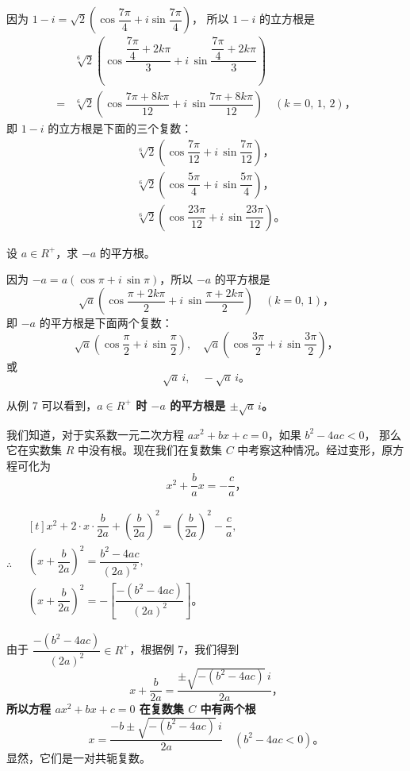 \jie 因为 $1 - i = \sqrt{2} \left( \cos\dfrac{7\pi}{4} + i \sin\dfrac{7\pi}{4} \right)$，
所以 $1 - i$ 的立方根是
\begin{align*}
    & \sqrt[6]{2} \left( \cos\dfrac{\dfrac{7\pi}{4} + 2k\pi}{3} + i\,\sin\dfrac{\dfrac{7\pi}{4} + 2k\pi}{3} \right) \\
    ={} & \sqrt[6]{2} \left( \cos\dfrac{7\pi + 8k\pi}{12} + i\,\sin\dfrac{7\pi + 8k\pi}{12} \right) \quad (k = 0,\, 1, \, 2) \text{，}
\end{align*}
即 $1 - i$ 的立方根是下面的三个复数：
\begin{align*}
    & \sqrt[6]{2} \left( \cos\dfrac{7\pi}{12} + i\,\sin\dfrac{7\pi}{12} \right) \text{，} \\
    & \sqrt[6]{2} \left( \cos\dfrac{5\pi}{4} + i\,\sin\dfrac{5\pi}{4} \right) \text{，} \\
    & \sqrt[6]{2} \left( \cos\dfrac{23\pi}{12} + i\,\sin\dfrac{23\pi}{12} \right) \text{。}
\end{align*}


\liti 设 $a \in R^+$，求 $-a$ 的平方根。

\jie 因为 $-a = a(\cos\pi + i\,\sin\pi)$，所以 $-a$ 的平方根是
$$ \sqrt{a} \left( \cos\dfrac{\pi + 2k\pi}{2} + i\,\sin\dfrac{\pi + 2k\pi}{2} \right) \quad (k = 0,\, 1) \text{，}$$
即 $-a$ 的平方根是下面两个复数：
$$
    \sqrt{a} \left( \cos\dfrac{\pi}{2} + i\,\sin\dfrac{\pi}{2} \right),\quad
    \sqrt{a} \left( \cos\dfrac{3\pi}{2} + i\,\sin\dfrac{3\pi}{2} \right) \text{，}
$$
或
$$ \sqrt{a}\,i, \quad -\sqrt{a}\,i \text{。} $$

从例 7 可以看到，\textbf{$a \in R^+$ 时 $-a$ 的平方根是 $\pm\sqrt{a}\,i$。}

我们知道，对于实系数一元二次方程 $ax^2 + bx + c = 0$，如果 $b^2 - 4ac < 0$，
那么它在实数集 $R$ 中没有根。现在我们在复数集 $C$ 中考察这种情况。经过变形，原方程可化为
$$ x^2 + \dfrac{b}{a} x = - \dfrac{c}{a} \text{，} $$

$\therefore \quad \begin{gathered}[t]
    x^2 + 2 \cdot x \cdot \dfrac{b}{2a} + \left( \dfrac{b}{2a} \right)^2 = \left( \dfrac{b}{2a} \right)^2 - \dfrac{c}{a}, \\
    \left( x + \dfrac{b}{2a} \right)^2 = \dfrac{b^2 - 4ac}{(2a)^2} , \\
    \left( x + \dfrac{b}{2a} \right)^2 = - \left[ \dfrac{-(b^2 - 4ac)}{(2a)^2} \right] \text{。}
\end{gathered}$

由于 $\dfrac{-(b^2 - 4ac)}{(2a)^2} \in R^+$，根据例 7，我们得到
$$ x + \dfrac{b}{2a} = \dfrac{\pm \sqrt{-(b^2 - 4ac)}\,i}{2a} \text{，} $$
\textbf{所以方程 $ax^2 + bx + c = 0$ 在复数集 $C$ 中有两个根
    $$ x = \dfrac{-b \pm \sqrt{-(b^2 - 4ac)}\,i}{2a} \quad (b^2 - 4ac < 0) \text{。} $$
}
显然，它们是一对共轭复数。



